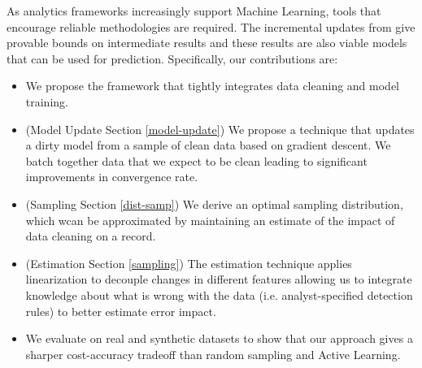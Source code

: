 As analytics frameworks increasingly support Machine Learning, tools that encourage reliable methodologies are required.
The incremental updates from \sys give provable bounds on intermediate results and these results are also viable models that can be used for prediction. 
Specifically, our contributions are:
\begin{itemize}[noitemsep]
\item We propose the \sys framework that tightly integrates data cleaning and model training.
\item (Model Update Section \ref{model-update}) We propose a technique that updates a dirty model from a sample of clean data based on gradient descent. We batch together data that we expect to be clean leading to significant improvements in convergence rate.
\item (Sampling Section \ref{dist-samp}) We derive an optimal sampling distribution, which wcan be approximated by maintaining an estimate of the impact of data cleaning on a record. 
\item (Estimation Section \ref{sampling}) The estimation technique applies linearization to decouple changes in different features allowing us to integrate knowledge about what is wrong with the data (i.e. analyst-specified detection rules) to better estimate error impact.
\item We evaluate \sysfull on real and synthetic datasets to show that our approach gives a sharper cost-accuracy tradeoff than random sampling and Active Learning.
\end{itemize}






